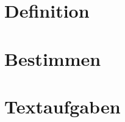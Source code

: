 \documentclass{article}
\begin{document}
\section{Definition}
\section{Bestimmen} 
\section{Textaufgaben}
\end{document}
